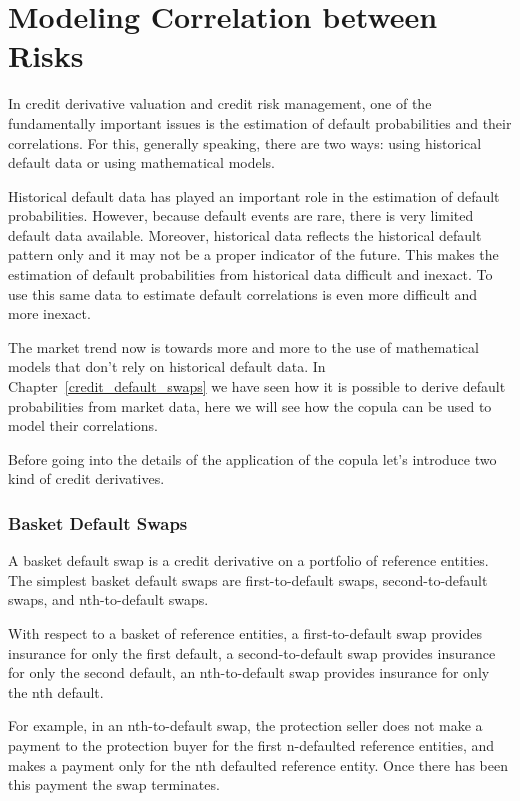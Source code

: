\chapter{Modeling Correlation between Risks}


In credit derivative valuation and credit risk management, one of the
fundamentally important issues is the estimation of default
probabilities and their correlations. For this, generally speaking,
there are two ways: using historical default data or using mathematical
models.

Historical default data has played an important role in the estimation
of default probabilities. However, because default events are rare,
there is very limited default data available. Moreover, historical data
reflects the historical default pattern only and it may not be a proper
indicator of the future. This makes the estimation of default
probabilities from historical data difficult and inexact. To use this
same data to estimate default correlations is even more difficult and
more inexact.

The market trend now is towards more and more to the use of mathematical
models that don't rely on historical default data. In
Chapter~\ref{credit_default_swaps} we have seen how it is possible to derive default probabilities from market data,
here we will see how the copula can be used to model their correlations. 

Before going into the details of the application of the copula let's introduce two kind of credit derivatives.

\subsection{Basket Default Swaps}\label{basket-default-swaps}

A basket default swap is a credit derivative on a portfolio of reference
entities. The simplest basket default swaps are first-to-default swaps,
second-to-default swaps, and nth-to-default swaps. 

With respect to a basket of reference entities, a first-to-default swap provides insurance for only the first default, 
a second-to-default swap provides insurance
for only the second default, an nth-to-default swap provides insurance
for only the nth default. 

For example, in an nth-to-default swap, the
protection seller does not make a payment to the protection buyer for
the first n-defaulted reference entities, and makes a payment only for the
nth defaulted reference entity. Once there has been this payment the swap terminates.

